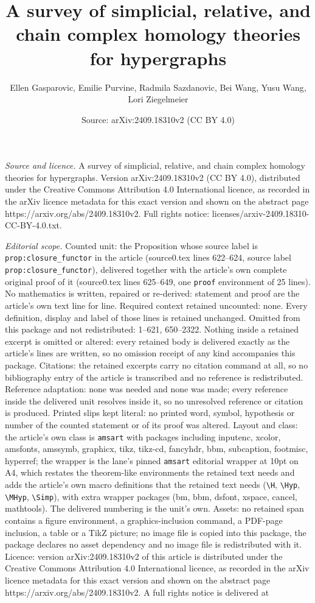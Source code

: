 \documentclass[10pt,a4paper]{amsart}
\title[A survey of simplicial, relative, and chain complex homology]{A survey of simplicial, relative, and chain complex homology theories for hypergraphs}
\author{Ellen Gasparovic, Emilie Purvine, Radmila Sazdanovic, Bei Wang, Yusu Wang, Lori Ziegelmeier}
\date{Source: arXiv:2409.18310v2 (CC BY 4.0)}
\begin{document}
\maketitle

\noindent\emph{Source and licence.} A survey of simplicial, relative, and chain complex homology theories for hypergraphs. Version arXiv:2409.18310v2 (CC BY 4.0), distributed under the Creative Commons Attribution 4.0 International licence, as recorded in the arXiv licence metadata for this exact version and shown on the abstract page https://arxiv.org/abs/2409.18310v2. Full rights notice: licenses/arxiv-2409.18310-CC-BY-4.0.txt.\par\smallskip

\noindent\textit{Editorial scope.} Counted unit: the Proposition whose source label is \texttt{prop:closure\_functor} in the article (source0.tex lines 622--624, source label \texttt{prop:closure\_functor}), delivered together with the article's own complete original proof of it (source0.tex lines 625--649, one \texttt{proof} environment of 25 lines). No mathematics is written, repaired or re-derived: statement and proof are the article's own text line for line. Required context retained uncounted: none. Every definition, display and label of those lines is retained unchanged. Omitted from this package and not redistributed: 1--621, 650--2322. Nothing inside a retained excerpt is omitted or altered: every retained body is delivered exactly as the article's lines are written, so no omission receipt of any kind accompanies this package. Citations: the retained excerpts carry no citation command at all, so no bibliography entry of the article is transcribed and no reference is redistributed. Reference adaptation: none was needed and none was made; every reference inside the delivered unit resolves inside it, so no unresolved reference or citation is produced. Printed slips kept literal: no printed word, symbol, hypothesis or number of the counted statement or of its proof was altered. Layout and class: the article's own class is \texttt{amsart} with packages including inputenc, xcolor, amsfonts, amssymb, graphicx, tikz, tikz-cd, fancyhdr, bbm, subcaption, footmisc, hyperref; the wrapper is the lane's pinned \texttt{amsart} editorial wrapper at 10pt on A4, which restates the theorem-like environments the retained text needs and adds the article's own macro definitions that the retained text needs (\texttt{\textbackslash H}, \texttt{\textbackslash Hyp}, \texttt{\textbackslash MHyp}, \texttt{\textbackslash Simp}), with extra wrapper packages (bm, bbm, dsfont, xspace, cancel, mathtools). The delivered numbering is the unit's own. Assets: no retained span contains a figure environment, a graphics-inclusion command, a PDF-page inclusion, a table or a TikZ picture; no image file is copied into this package, the package declares no asset dependency and no image file is redistributed with it. Licence: version arXiv:2409.18310v2 of this article is distributed under the Creative Commons Attribution 4.0 International licence, as recorded in the arXiv licence metadata for this exact version and shown on the abstract page https://arxiv.org/abs/2409.18310v2. A full rights notice is delivered at 
\end{document}
